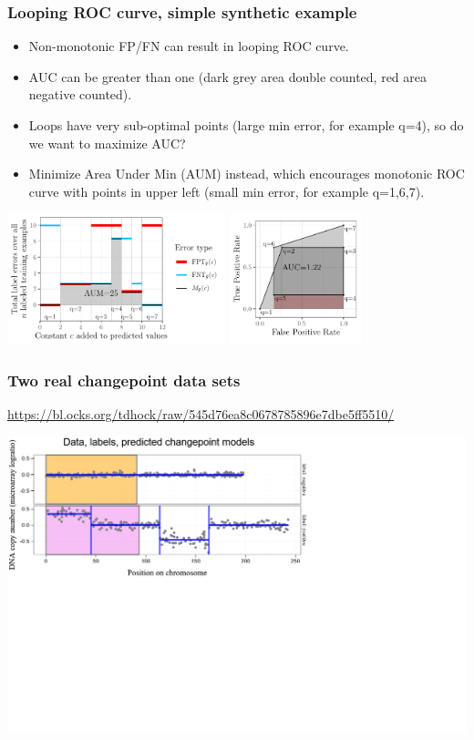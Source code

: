 \documentclass[t]{beamer}
\begin{document}
\begin{frame}
  \frametitle{Looping ROC curve, simple synthetic example}

  \begin{itemize}
  \item Non-monotonic FP/FN can result in looping ROC curve.
  \item AUC can be greater than one (dark grey area double counted,
    red area negative counted).
  \item Loops have very sub-optimal points (large min error, for
    example q=4), so do we want to maximize AUC?
  \item Minimize Area Under Min (AUM) instead, which encourages
    monotonic ROC curve with points in upper left (small min error,
    for example q=1,6,7).
  \end{itemize}
 
  \includegraphics[height=1.5in]{figure-more-than-one-more-aum-nomath}
  \includegraphics[height=1.5in]{figure-more-than-one-more-auc}

\end{frame}

\begin{frame}
  \frametitle{Two real changepoint data sets}
  {\scriptsize\url{https://bl.ocks.org/tdhock/raw/545d76ea8c0678785896e7dbe5ff5510/}}
  
  \includegraphics[width=\textwidth]{figure-aum-convexity-interactive-cropped/d4r4-1.PNG}  
\end{frame} 
\end{document}
